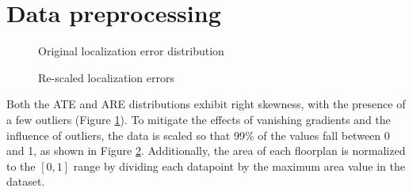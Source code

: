 \section{Data preprocessing} %

\begin{figure}[ht!]
    \centering
    \caption{Original localization error distribution}\label{fig:dataDistribution}
\end{figure}

\begin{figure}[ht!]
    \centering
    \caption{Re-scaled localization errors}\label{fig:dataDistribution_scaled}
\end{figure}

\noindent
Both the ATE and ARE distributions exhibit right skewness, with the presence of a few outliers (Figure \ref{fig:dataDistribution}). To mitigate the effects of vanishing gradients and the influence of outliers, the data is scaled so that 99\% of the values fall between 0 and 1, as shown in Figure \ref{fig:dataDistribution_scaled}. Additionally, the area of each floorplan is normalized to the $[0, 1]$ range by dividing each datapoint by the maximum area value in the dataset.


